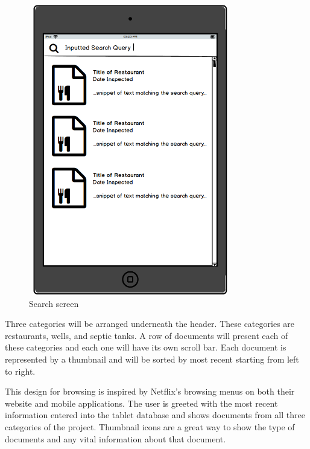 \documentclass[twoside,letterpaper]{article}
\begin{document}
{\begin{figure}[h]
\centering
\includegraphics[width=3.5in,height=5in]{Search.png}
\caption{Search screen}
\end{figure}
\newpage
\noindent Three categories will be arranged underneath the header. These categories are restaurants, wells, and septic tanks. A row of documents will present each of these categories and each one will have its own scroll bar. Each document is represented by a thumbnail and will be sorted by most recent starting from left to right.
\newline

\noindent This design for browsing is inspired by Netflix's browsing menus on both their website and mobile applications. The user is greeted with the most recent information entered into the tablet database and shows documents from all three categories of the project. Thumbnail icons are a great way to show the type of documents and any vital information about that document.
\newline

}
\end{document}
